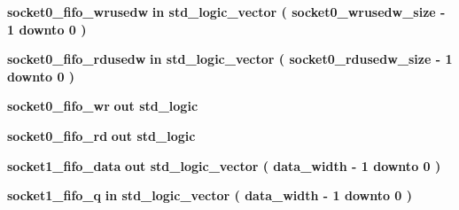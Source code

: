 \begin{DoxyCompactItemize}
\item 
{\bf socket0\+\_\+fifo\+\_\+wrusedw}  {\bfseries {\bfseries \textcolor{keywordflow}{in}\textcolor{vhdlchar}{ }}} {\bfseries \textcolor{comment}{std\+\_\+logic\+\_\+vector}\textcolor{vhdlchar}{ }\textcolor{vhdlchar}{(}\textcolor{vhdlchar}{ }\textcolor{vhdlchar}{ }\textcolor{vhdlchar}{ }\textcolor{vhdlchar}{ }{\bfseries {\bf socket0\+\_\+wrusedw\+\_\+size}} \textcolor{vhdlchar}{-\/}\textcolor{vhdlchar}{ } \textcolor{vhdldigit}{1} \textcolor{vhdlchar}{ }\textcolor{keywordflow}{downto}\textcolor{vhdlchar}{ }\textcolor{vhdlchar}{ } \textcolor{vhdldigit}{0} \textcolor{vhdlchar}{ }\textcolor{vhdlchar}{)}\textcolor{vhdlchar}{ }} 
\item 
{\bf socket0\+\_\+fifo\+\_\+rdusedw}  {\bfseries {\bfseries \textcolor{keywordflow}{in}\textcolor{vhdlchar}{ }}} {\bfseries \textcolor{comment}{std\+\_\+logic\+\_\+vector}\textcolor{vhdlchar}{ }\textcolor{vhdlchar}{(}\textcolor{vhdlchar}{ }\textcolor{vhdlchar}{ }\textcolor{vhdlchar}{ }\textcolor{vhdlchar}{ }{\bfseries {\bf socket0\+\_\+rdusedw\+\_\+size}} \textcolor{vhdlchar}{-\/}\textcolor{vhdlchar}{ } \textcolor{vhdldigit}{1} \textcolor{vhdlchar}{ }\textcolor{keywordflow}{downto}\textcolor{vhdlchar}{ }\textcolor{vhdlchar}{ } \textcolor{vhdldigit}{0} \textcolor{vhdlchar}{ }\textcolor{vhdlchar}{)}\textcolor{vhdlchar}{ }} 
\item 
{\bf socket0\+\_\+fifo\+\_\+wr}  {\bfseries {\bfseries \textcolor{keywordflow}{out}\textcolor{vhdlchar}{ }}} {\bfseries \textcolor{comment}{std\+\_\+logic}\textcolor{vhdlchar}{ }} 
\item 
{\bf socket0\+\_\+fifo\+\_\+rd}  {\bfseries {\bfseries \textcolor{keywordflow}{out}\textcolor{vhdlchar}{ }}} {\bfseries \textcolor{comment}{std\+\_\+logic}\textcolor{vhdlchar}{ }} 
\item 
{\bf socket1\+\_\+fifo\+\_\+data}  {\bfseries {\bfseries \textcolor{keywordflow}{out}\textcolor{vhdlchar}{ }}} {\bfseries \textcolor{comment}{std\+\_\+logic\+\_\+vector}\textcolor{vhdlchar}{ }\textcolor{vhdlchar}{(}\textcolor{vhdlchar}{ }\textcolor{vhdlchar}{ }\textcolor{vhdlchar}{ }\textcolor{vhdlchar}{ }{\bfseries {\bf data\+\_\+width}} \textcolor{vhdlchar}{-\/}\textcolor{vhdlchar}{ } \textcolor{vhdldigit}{1} \textcolor{vhdlchar}{ }\textcolor{keywordflow}{downto}\textcolor{vhdlchar}{ }\textcolor{vhdlchar}{ } \textcolor{vhdldigit}{0} \textcolor{vhdlchar}{ }\textcolor{vhdlchar}{)}\textcolor{vhdlchar}{ }} 
\item 
{\bf socket1\+\_\+fifo\+\_\+q}  {\bfseries {\bfseries \textcolor{keywordflow}{in}\textcolor{vhdlchar}{ }}} {\bfseries \textcolor{comment}{std\+\_\+logic\+\_\+vector}\textcolor{vhdlchar}{ }\textcolor{vhdlchar}{(}\textcolor{vhdlchar}{ }\textcolor{vhdlchar}{ }\textcolor{vhdlchar}{ }\textcolor{vhdlchar}{ }{\bfseries {\bf data\+\_\+width}} \textcolor{vhdlchar}{-\/}\textcolor{vhdlchar}{ } \textcolor{vhdldigit}{1} \textcolor{vhdlchar}{ }\textcolor{keywordflow}{downto}\textcolor{vhdlchar}{ }\textcolor{vhdlchar}{ } \textcolor{vhdldigit}{0} \textcolor{vhdlchar}{ }\textcolor{vhdlchar}{)}\textcolor{vhdlchar}{ }} 

\end{DoxyCompactItemize}
